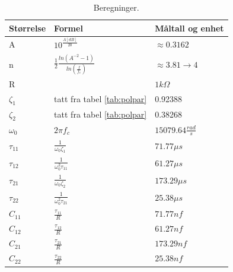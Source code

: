 \begin{table}[hbt]
    \centering
    \caption{Beregninger.}
    \begin{Large}
    \begin{tabular}{|l|l|l|}
        \hline
        Størrelse   & Formel                                              & Måltall og enhet          \\ \hline
        A           & $10^{\frac{A[dB]}{20}}$                             & $\approx0.3162$           \\ \hline
        n           & $\frac{1}{2}\frac{ln(A^{-2}-1)}{ln(\frac{f}{f_c})}$ & $\approx3.81\rightarrow4$ \\ \hline
        R           &                                                     & $1k\Omega$                \\ \hline
        $\zeta_1$   & tatt fra tabel \ref{tab:polpar}                     & 0.92388                   \\ \hline
        $\zeta_2$   & tatt fra tabel \ref{tab:polpar}                     & 0.38268                   \\ \hline
        $\omega_0$  & $2\pi f_c$                                          & $15079.64\frac{rad}{s}$   \\ \hline
        $\tau_{11}$ & $\frac{1}{\omega_0 \zeta_1}$                        & $71.77\mu s$              \\ \hline
        $\tau_{12}$ & $\frac{1}{\omega_0^2 \tau_{11}}$                    & $61.27\mu s$              \\ \hline
        $\tau_{21}$ & $\frac{1}{\omega_0 \zeta_2}$                        & $173.29\mu s$             \\ \hline
        $\tau_{22}$ & $\frac{1}{\omega_0^2 \tau_{21}}$                    & $25.38\mu s$              \\ \hline
        $C_{11}$      & $\frac{\tau_{11}}{R}$                               & $71.77nf$              \\ \hline
        $C_{12}$      & $\frac{\tau_{12}}{R}$                               & $61.27nf$              \\ \hline
        $C_{21}$      & $\frac{\tau_{21}}{R}$                               & $173.29nf$             \\ \hline
        $C_{22}$      & $\frac{\tau_{22}}{R}$                               & $25.38nf$              \\ \hline
        \end{tabular}
    \end{Large}
    \label{tab:calculations}
    \end{table}

